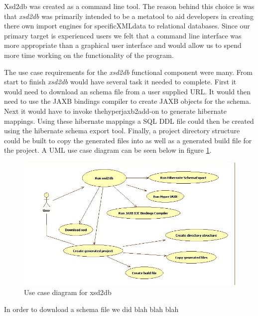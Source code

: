 Xsd2db was created as a command line tool.  The reason behind this choice is was that \emph{xsd2db} was primarily intended to be a metatool to aid developers in creating there own import engines for specificXMLdata to relational databases.  Since our primary target is experienced users we felt that a command line interface was more appropriate than a graphical user interface and would allow us to spend more time working on the functionality of the program.    

The use case requirements for the \emph{xsd2db} functional component were many.  From start to finish \emph{xsd2db} would have several task it needed to complete.  First it would need to download an schema file from a user supplied URL.  It would then need to use the JAXB bindings compiler to create JAXB objects for the schema.  Next it would have to invoke thehyperjaxb2add-on to generate hibernate mappings.  Using these hibernate mappings a SQL DDL file could then be created using the hibernate schema export tool.  Finally, a project directory structure could be built to copy the generated files into as well as a generated build file for the project.  A UML use case diagram can be seen below in figure \ref{xsd2dbUMLUseCase}.

\begin{figure}[htbp]
\begin{center}
\includegraphics[scale=0.5]{./Images/xsd2dbUseCase.jpg}
\caption{Use case diagram for xsd2db}
\label{xsd2dbUMLUseCase}
\end{center}
\end{figure}

In order to download a schema file we did blah blah blah 

